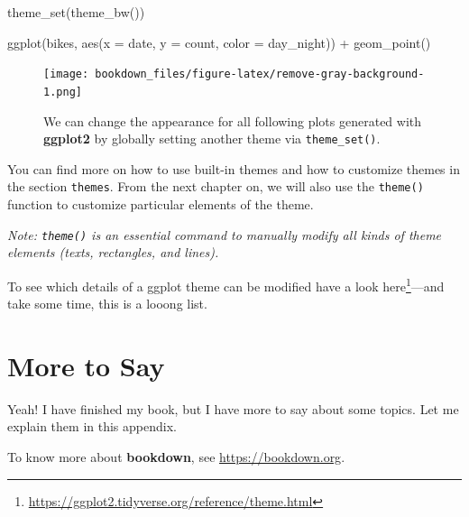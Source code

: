 \documentclass[
]{krantz}
\makeatletter
\newenvironment{Shaded}{\begin{snugshade}}{\end{snugshade}}
\newcommand{\AttributeTok}[1]{\textcolor[rgb]{0.61,0.61,0.61}{#1}}
\newcommand{\FunctionTok}[1]{\textcolor[rgb]{0,0,0}{#1}}
\newcommand{\NormalTok}[1]{#1}
\newcommand{\SpecialCharTok}[1]{\textcolor[rgb]{0,0,0}{#1}}
\renewcommand{\href}[2]{#2\footnote{\url{#1}}}
\newenvironment{kframe}{%
\medskip{}
\setlength{\fboxsep}{.8em}
 \def\at@end@of@kframe{}%
 \ifinner\ifhmode%
  \def\at@end@of@kframe{\end{minipage}}%
  \begin{minipage}{\columnwidth}%
 \fi\fi%
 \def\FrameCommand##1{\hskip\@totalleftmargin \hskip-\fboxsep
 \colorbox{shadecolor}{##1}\hskip-\fboxsep
     \hskip-\linewidth \hskip-\@totalleftmargin \hskip\columnwidth}%
 \MakeFramed {\advance\hsize-\width
   \@totalleftmargin\z@ \linewidth\hsize
   \@setminipage}}%
 {\par\unskip\endMakeFramed%
 \at@end@of@kframe}
\renewenvironment{Shaded}{\begin{kframe}}{\end{kframe}}
\makeatother
\begin{document}
\begin{Shaded}
\begin{Highlighting}[]
\FunctionTok{theme\_set}\NormalTok{(}\FunctionTok{theme\_bw}\NormalTok{())}

\FunctionTok{ggplot}\NormalTok{(bikes, }\FunctionTok{aes}\NormalTok{(}\AttributeTok{x =}\NormalTok{ date, }\AttributeTok{y =}\NormalTok{ count, }\AttributeTok{color =}\NormalTok{ day\_night)) }\SpecialCharTok{+} 
  \FunctionTok{geom\_point}\NormalTok{()}
\end{Highlighting}
\end{Shaded}

\begin{figure}
\centering
\texttt{[image: bookdown\_files/figure-latex/remove-gray-background-1.png]}
\caption{\label{fig:remove-gray-background}We can change the appearance for all following plots generated with \textbf{ggplot2} by globally setting another theme via \texttt{theme\_set()}.}
\end{figure}

You can find more on how to use built-in themes and how to customize themes in the section \texttt{themes}. From the next chapter on, we will also use the \texttt{theme()} function to customize particular elements of the theme.

\emph{Note: \texttt{theme()} is an essential command to manually modify all kinds of theme elements (texts, rectangles, and lines).}

To see which details of a ggplot theme can be modified have a look \href{https://ggplot2.tidyverse.org/reference/theme.html}{here}---and take some time, this is a looong list.

\cleardoublepage

\hypertarget{appendix-appendix}{%
\appendix {}}


\hypertarget{more-to-say}{%
\chapter{More to Say}\label{more-to-say}}

Yeah! I have finished my book, but I have more to say about some topics. Let me explain them in this appendix.

To know more about \textbf{bookdown}, see \url{https://bookdown.org}.

  

\backmatter
\printindex
\end{document}
